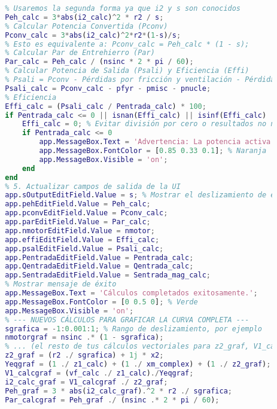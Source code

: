 \begin{lstlisting}[language=Matlab, caption={MATLAB Code}, basicstyle=\footnotesize\ttfamily]
        % Peh se puede calcular de dos formas: Pentrada - Pcu1 - Pnucle O 3*abs(i2)^2*r2/s
        % Usaremos la segunda forma ya que i2 y s son conocidos
        Peh_calc = 3*abs(i2_calc)^2 * r2 / s;
        % Calcular Potencia Convertida (Pconv)
        Pconv_calc = 3*abs(i2_calc)^2*r2*(1-s)/s;
        % Esto es equivalente a: Pconv_calc = Peh_calc * (1 - s);
        % Calcular Par de Entrehierro (Par)
        Par_calc = Peh_calc / (nsinc * 2 * pi / 60);
        % Calcular Potencia de Salida (Psali) y Eficiencia (Effi)
        % Psali = Pconv - Pérdidas por fricción y ventilación - Pérdidas misceláneas - Pérdidas en el núcleo
        Psali_calc = Pconv_calc - pfyr - pmisc - pnucle;
        % Eficiencia
        Effi_calc = (Psali_calc / Pentrada_calc) * 100;
        if Pentrada_calc <= 0 || isnan(Effi_calc) || isinf(Effi_calc)
            Effi_calc = 0; % Evitar división por cero o resultados no numéricos
            if Pentrada_calc <= 0
                app.MessageBox.Text = 'Advertencia: La potencia activa de entrada es cero o negativa. La eficiencia no se puede calcular o no es aplicable.';
                app.MessageBox.FontColor = [0.85 0.33 0.1]; % Naranja
                app.MessageBox.Visible = 'on';
            end
        end
        % 5. Actualizar campos de salida de la UI
        app.sOutputEditField.Value = s; % Mostrar el deslizamiento de entrada
        app.pehEditField.Value = Peh_calc;
        app.pconvEditField.Value = Pconv_calc;
        app.parEditField.Value = Par_calc;
        app.nmotorEditField.Value = nmotor;
        app.effiEditField.Value = Effi_calc;
        app.psalEditField.Value = Psali_calc;
        app.PentradaEditField.Value = Pentrada_calc;
        app.QentradaEditField.Value = Qentrada_calc;
        app.SentradaEditField.Value = Sentrada_mag_calc;
        % Mostrar mensaje de éxito
        app.MessageBox.Text = 'Cálculos completados exitosamente.';
        app.MessageBox.FontColor = [0 0.5 0]; % Verde
        app.MessageBox.Visible = 'on';
        % --- NUEVOS CÁLCULOS PARA GRAFICAR LA CURVA COMPLETA ---
        sgrafica = -1:0.001:1; % Rango de deslizamiento, por ejemplo
        nmotorgraf = nsinc .* (1 - sgrafica);
        % ... (el resto de tus cálculos vectoriales para z2_graf, V1_calcgraf, i2_calc_graf, Peh_graf, Par_calcgraf) ...
        z2_graf = (r2 ./ sgrafica) + 1j * x2;
        Yeqgraf = (1 ./ z1_calc) + (1 ./ xm_complex) + (1 ./ z2_graf);
        V1_calcgraf = (vf_calc ./ z1_calc)./Yeqgraf;
        i2_calc_graf = V1_calcgraf ./ z2_graf;
        Peh_graf = 3 * abs(i2_calc_graf).^2 * r2 ./ sgrafica;
        Par_calcgraf = Peh_graf ./ (nsinc .* 2 * pi / 60);

\end{lstlisting}
